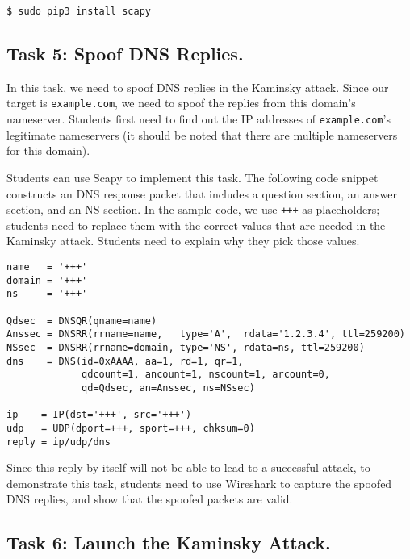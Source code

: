 \begin{lstlisting}
$ sudo pip3 install scapy
\end{lstlisting}
 

\subsection{Task 5: Spoof DNS Replies.}   

In this task, we need to spoof DNS replies in the Kaminsky attack. 
Since our target is \texttt{example.com}, we need to spoof
the replies from this domain's nameserver. Students first need to 
find out the IP addresses of \texttt{example.com}'s legitimate 
nameservers (it should be noted that there are multiple 
nameservers for this domain).

Students can use Scapy to implement this task. The following 
code snippet constructs an DNS response packet that includes 
a question section, an answer section, and an NS section. 
In the sample code, we use \texttt{+++} as placeholders; 
students need to replace them with the correct values 
that are needed in the Kaminsky attack. Students need to explain
why they pick those values. 

\begin{lstlisting}
name   = '+++'  
domain = '+++'  
ns     = '+++'

Qdsec  = DNSQR(qname=name)
Anssec = DNSRR(rrname=name,   type='A',  rdata='1.2.3.4', ttl=259200)
NSsec  = DNSRR(rrname=domain, type='NS', rdata=ns, ttl=259200)
dns    = DNS(id=0xAAAA, aa=1, rd=1, qr=1,
             qdcount=1, ancount=1, nscount=1, arcount=0,
             qd=Qdsec, an=Anssec, ns=NSsec)

ip    = IP(dst='+++', src='+++')
udp   = UDP(dport=+++, sport=+++, chksum=0)
reply = ip/udp/dns
\end{lstlisting}
 

Since this reply by itself will not be able to lead to a successful 
attack, to demonstrate this task, students need to 
use Wireshark to capture the spoofed DNS replies, and 
show that the spoofed packets are valid. 


\subsection{Task 6: Launch the Kaminsky Attack.}   

